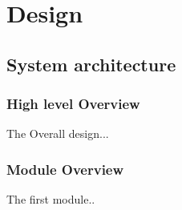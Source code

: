 \section{Design}
\label{sec:design}

\subsection{System architecture}
\label{subsec:system_archutecture}

\subsubsection{High level Overview}
\label{subsubsec:high_level_overview}

The Overall design...

\subsubsection{Module Overview}
\label{subsubsec:module_overview}

The first module..